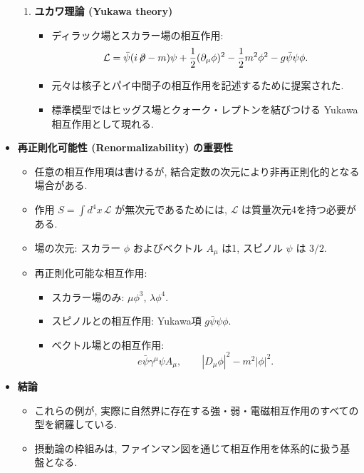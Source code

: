 \documentclass[a4paper,12pt]{article}
\begin{document}
\begin{itemize}
\begin{enumerate}
    \item \textbf{ユカワ理論 (Yukawa theory)}
    \begin{itemize}
      \item ディラック場とスカラー場の相互作用:
      \begin{equation*}
        \mathcal{L} = \bar{\psi}(i\!\not\!\partial - m)\psi
        + \frac{1}{2}(\partial_\mu \phi)^2
        - \frac{1}{2}m^2 \phi^2
        - g \bar{\psi}\psi \phi .
      \end{equation*}
      \item 元々は核子とパイ中間子の相互作用を記述するために提案された.
      \item 標準模型ではヒッグス場とクォーク・レプトンを結びつける Yukawa 相互作用として現れる.
    \end{itemize}
  \end{enumerate}

  \item \textbf{再正則化可能性 (Renormalizability) の重要性}
  \begin{itemize}
    \item 任意の相互作用項は書けるが, 結合定数の次元により非再正則化的となる場合がある.
    \item 作用 $S=\int d^4x \, \mathcal{L}$ が無次元であるためには, $\mathcal{L}$ は質量次元4を持つ必要がある.
    \item 場の次元: スカラー $\phi$ およびベクトル $A_\mu$ は1, スピノル $\psi$ は $3/2$.
    \item 再正則化可能な相互作用:
    \begin{itemize}
      \item スカラー場のみ: $\mu \phi^3$, $\lambda \phi^4$.
      \item スピノルとの相互作用: Yukawa項 $g \bar{\psi}\psi\phi$.
      \item ベクトル場との相互作用: 
      \begin{equation*}
        e \bar{\psi}\gamma^\mu \psi A_\mu, 
        \qquad |D_\mu \phi|^2 - m^2|\phi|^2 .
      \end{equation*}
    \end{itemize}
  \end{itemize}

  \item \textbf{結論}
  \begin{itemize}
    \item これらの例が, 実際に自然界に存在する強・弱・電磁相互作用のすべての型を網羅している.
    \item 摂動論の枠組みは, ファインマン図を通じて相互作用を体系的に扱う基盤となる.
  \end{itemize}

\end{itemize}
\end{document}
